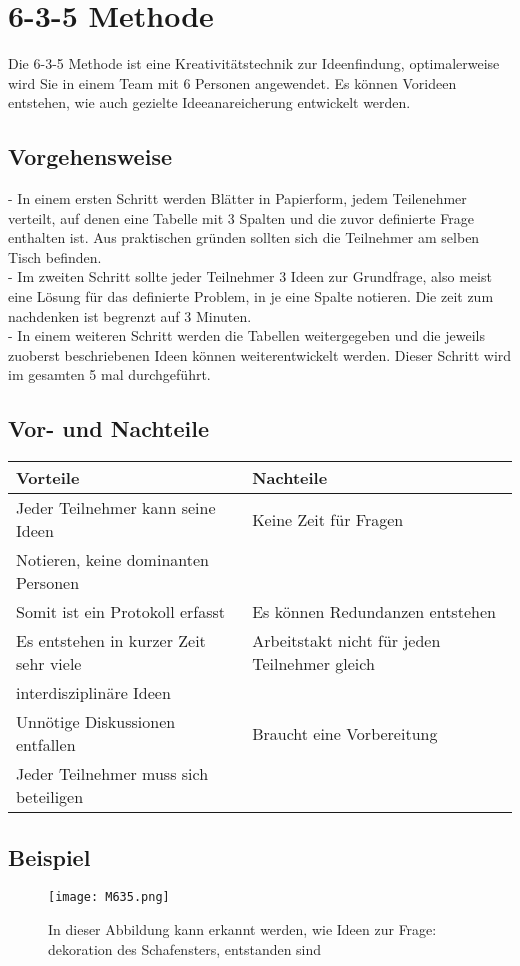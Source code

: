 \section{6-3-5 Methode}\label{sec:635Methode}
Die 6-3-5 Methode ist eine Kreativitätstechnik zur Ideenfindung, optimalerweise wird Sie in einem Team mit 6 Personen angewendet. Es können Vorideen entstehen, wie auch gezielte Ideeanareicherung entwickelt werden.
\subsection{Vorgehensweise}
- In einem ersten Schritt werden Blätter in Papierform, jedem Teilenehmer verteilt, auf denen eine Tabelle mit 3 Spalten und die zuvor definierte Frage enthalten ist. Aus praktischen gründen sollten sich die Teilnehmer am selben Tisch befinden.\\
- Im zweiten Schritt sollte jeder Teilnehmer 3 Ideen zur Grundfrage, also meist eine Lösung für das definierte Problem, in je eine Spalte notieren. Die zeit zum nachdenken ist begrenzt auf 3 Minuten.\\
- In einem weiteren Schritt werden die Tabellen weitergegeben und die jeweils zuoberst beschriebenen Ideen können weiterentwickelt werden. Dieser Schritt wird im gesamten 5 mal durchgeführt.
\subsection{Vor- und Nachteile}
\begin{tabular}{|l|l|}
	\hline 
	Vorteile & Nachteile \\ 
	\hline 
	Jeder Teilnehmer kann seine Ideen & Keine Zeit für Fragen  \\
	 Notieren, keine dominanten Personen&\\ 
	\hline 
	Somit ist ein Protokoll erfasst&Es können Redundanzen entstehen \\ 
	\hline 
	Es entstehen in kurzer Zeit sehr viele&Arbeitstakt nicht für jeden Teilnehmer gleich\\
	interdisziplinäre Ideen&  \\ 
	\hline 
	Unnötige Diskussionen entfallen&Braucht eine Vorbereitung \\ 
	\hline 
	Jeder Teilnehmer muss sich beteiligen&  \\ 
	\hline 
\end{tabular} 
\subsection{Beispiel}
\begin{figure}[H]
	\centering
	\texttt{[image: M635.png]}
	\caption{In dieser Abbildung kann erkannt werden, wie Ideen zur Frage: dekoration des Schafensters, entstanden sind}
\end{figure}
